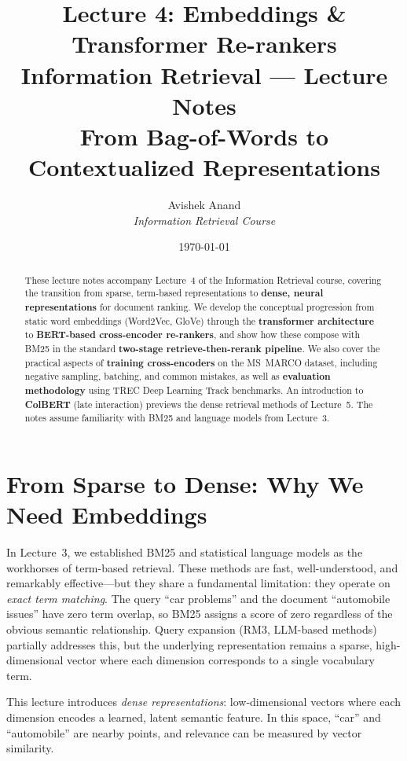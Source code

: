 \documentclass[11pt,a4paper]{article}
\title{\textbf{Lecture 4: Embeddings \& Transformer Re-rankers}\\[0.5em]\Large Information Retrieval --- Lecture Notes\\[0.3em]\normalsize From Bag-of-Words to Contextualized Representations}
\author{Avishek Anand\\\textit{Information Retrieval Course}}
\date{\today}
\theoremstyle{definition}
\theoremstyle{plain}
\begin{document}
\maketitle

\begin{abstract}
These lecture notes accompany Lecture~4 of the Information Retrieval course, covering the transition from sparse, term-based representations to \textbf{dense, neural representations} for document ranking. We develop the conceptual progression from static word embeddings (Word2Vec, GloVe) through the \textbf{transformer architecture} to \textbf{BERT-based cross-encoder re-rankers}, and show how these compose with BM25 in the standard \textbf{two-stage retrieve-then-rerank pipeline}. We also cover the practical aspects of \textbf{training cross-encoders} on the MS~MARCO dataset, including negative sampling, batching, and common mistakes, as well as \textbf{evaluation methodology} using TREC Deep Learning Track benchmarks. An introduction to \textbf{ColBERT} (late interaction) previews the dense retrieval methods of Lecture~5. The notes assume familiarity with BM25 and language models from Lecture~3.
\end{abstract}

\tableofcontents
\newpage

\section{From Sparse to Dense: Why We Need Embeddings}
\label{sec:sparse-to-dense}

In Lecture~3, we established BM25 and statistical language models as the workhorses of term-based retrieval. These methods are fast, well-understood, and remarkably effective---but they share a fundamental limitation: they operate on \emph{exact term matching}. The query ``car problems'' and the document ``automobile issues'' have zero term overlap, so BM25 assigns a score of zero regardless of the obvious semantic relationship. Query expansion (RM3, LLM-based methods) partially addresses this, but the underlying representation remains a sparse, high-dimensional vector where each dimension corresponds to a single vocabulary term.

This lecture introduces \emph{dense representations}: low-dimensional vectors where each dimension encodes a learned, latent semantic feature. In this space, ``car'' and ``automobile'' are nearby points, and relevance can be measured by vector similarity.
\end{document}
